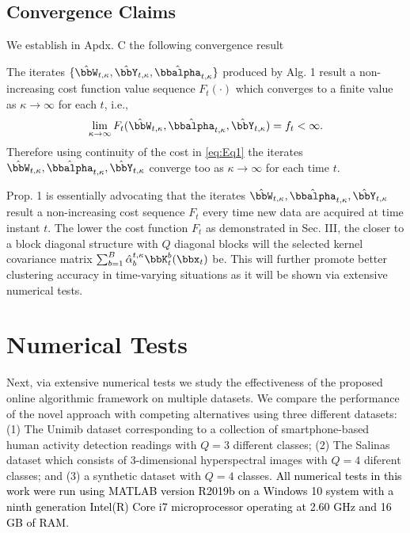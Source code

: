 \documentclass[10pt,final]{IEEEtran}
\begin{document}
\subsection{Convergence Claims}\label{sec:Convergence}
We establish in Apdx. C the following convergence result
\begin{proposition}\label{thm:Central_Conv}
The iterates $\{\hat{\bbW}_{t,\kappa},\hat{\bbY}_{t,\kappa},\hat{\bbalpha}_{t,\kappa}\}$ produced by Alg. 1 result  a non-increasing cost function value sequence $F_{t}(\cdot)$ which converges to a finite value as $\kappa\rightarrow\infty$ for each $t$, i.e.,     
\begin{equation}\label{eq:lim_cost_central}
\lim_{\kappa\rightarrow\infty}
F_{t}(\hat{\bbW}_{t,\kappa},\hat{\bbalpha}_{t,\kappa},\hat{\bbY}_{t,\kappa})=f_t<\infty.
\end{equation}
Therefore using continuity of the cost in \eqref{eq:Eq1} the iterates $\hat{\bbW}_{t,\kappa},\hat{\bbalpha}_{t,\kappa},\hat{\bbY}_{t,\kappa}$ converge too as $\kappa\rightarrow\infty$ for each time  $t$.
\end{proposition}

Prop. 1 is essentially advocating that the iterates 
$\hat{\bbW}_{t,\kappa},\hat{\bbalpha}_{t,\kappa},\hat{\bbY}_{t,\kappa}$
result a non-increasing cost sequence $F_t$ every time new data are acquired at time instant $t$. The lower the cost function $F_t$ as demonstrated in Sec. III, the closer to a block diagonal structure with $Q$ diagonal blocks will the selected kernel covariance matrix $\sum_{b=1}^B\hat{\alpha}_b^{t,\kappa}\bbK_t^b(\bbx_t)$ be. This will further promote better clustering accuracy in time-varying situations as it will be  shown via extensive numerical tests.

\section{Numerical Tests}\label{sec:distributed}
Next, via extensive numerical tests we study the effectiveness of the proposed online algorithmic framework on multiple datasets. We compare the performance of the novel approach with competing alternatives using three different datasets: (1) The Unimib dataset \textcolor{black}{\cite{Unimib}} corresponding to a collection of smartphone-based human activity detection readings with $Q=3$ different classes; (2) The  Salinas dataset \textcolor{black}{\cite{Salinas}} which consists of 3-dimensional hyperspectral images with $Q=4$ diferent classes; and (3) a synthetic dataset with $Q=4$ classes.
 \textcolor{black}{All numerical tests in this work were run using MATLAB version R2019b on a Windows 10 system with a ninth generation Intel(R) Core i7 microprocessor operating at 2.60 GHz and 16 GB of RAM.}
 
\end{document}
